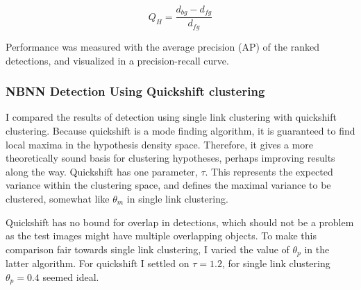 \begin{equation}
    Q_H = \frac{d_{bg} - d_{fg}}{d_{fg}}
    \label{eq:qh}
\end{equation}

Performance was measured with the average precision (AP) of the ranked detections, and visualized in a precision-recall curve.

\subsubsection{NBNN Detection Using Quickshift clustering} %
\label{sub:nbnn_detection_using_quickshift_clustering}

I compared the results of detection using single link clustering with quickshift clustering. Because quickshift is a mode finding algorithm, it is guaranteed to find local maxima in the hypothesis density space. Therefore, it gives a more theoretically sound basis for clustering hypotheses, perhaps improving results along the way. Quickshift has one parameter, $\tau$. This represents the expected variance within the clustering space, and defines the maximal variance to be clustered, somewhat like $\theta_m$ in single link clustering.

Quickshift has no bound for overlap in detections, which should not be a problem as the test images might have multiple overlapping objects. To make this comparison fair towards single link clustering, I varied the value of $\theta_p$ in the latter algorithm. For quickshift I settled on $\tau = 1.2$, for single link clustering $\theta_p = 0.4$ seemed ideal.

